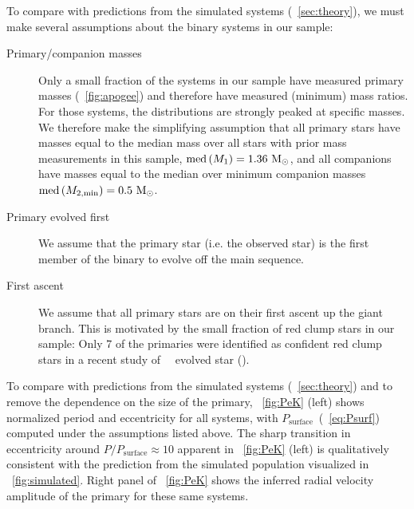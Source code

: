 \documentclass[modern, letterpaper]{aastex62}
\newcommand{\apogee}{\project{\acronym{APOGEE}}}
\newcommand{\DR}{\acronym{DR14}}
\newcommand{\med}[1]{\ensuremath{\textrm{med}\left(#1\right)}}
\newcommand{\Psurf}{\ensuremath{P_\textrm{surface}}}
\begin{document}
To compare with predictions from the simulated systems
(\sectionname~\ref{sec:theory}), we must make several assumptions about the binary systems in our sample:
\begin{description}
    \item[Primary/companion masses] Only a small fraction of the systems in our
    sample have measured primary masses (\figurename~\ref{fig:apogee}) and
    therefore have measured (minimum) mass ratios.
    For those systems, the distributions are strongly peaked at specific masses.
    We therefore make the simplifying assumption that all primary stars have
    masses equal to the median mass over all stars with prior mass measurements
    in this sample, $\med{M_1} = 1.36~\msun$, and all companions have masses
    equal to the median over minimum companion masses $\med{M_{2, \textrm{min}}}
    = 0.5~\msun$.
    \item[Primary evolved first] We assume that the primary star (i.e. the
    observed star) is the first member of the binary to evolve off the main
    sequence.
    \item[First ascent] We assume that all primary stars are on their first
    ascent up the giant branch.
    This is motivated by the small fraction of red clump stars in our sample:
    Only 7 of the primaries were identified as confident red clump stars in a
    recent study of \apogee\ \DR\ evolved star (\citealt{Ting:2018}).
\end{description}

To compare with predictions from the simulated systems
(\sectionname~\ref{sec:theory}) and to remove the dependence on the size of the
primary, \figurename~\ref{fig:PeK} (left) shows normalized period and
eccentricity for all systems, with \Psurf\ (\eqname~\ref{eq:Psurf}) computed
under the assumptions listed above.
The sharp transition in eccentricity around $P/\Psurf \approx 10$ apparent in
\figurename~\ref{fig:PeK} (left) is qualitatively consistent with the prediction
from the simulated population visualized in \figurename~\ref{fig:simulated}.
Right panel of \figurename~\ref{fig:PeK} shows the inferred radial velocity
amplitude of the primary for these same systems.
\end{document}

